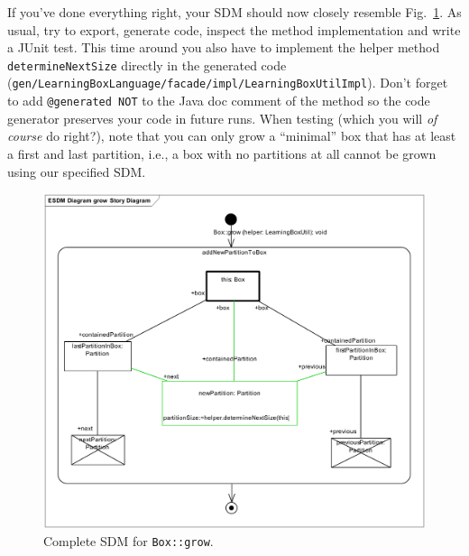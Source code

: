 If you've done everything right, your SDM should now closely resemble
Fig.~\ref{fig:sdm_grow_5}.  As usual, try to export, generate code, inspect the
method implementation and write a JUnit test.  This time around you also have to
implement the helper method \texttt{determineNextSize} directly in the
generated code
(\texttt{gen/\-LearningBoxLanguage/\-facade/\-impl/\-LearningBoxUtilImpl}).
Don't forget to add \texttt{@generated NOT} to the Java doc comment of the
method so the code generator preserves your code in future runs.
When testing (which you will \emph{of course} do right?), note that you can only grow a ``minimal'' box that has at least a first and last partition, i.e., a box with no partitions at all cannot be grown using our specified SDM. 

\begin{figure}[htbp]
\begin{center}
  \includegraphics[width=\textwidth]{pics/sdmBilder/grow/sdm67}
  \caption{Complete SDM for \texttt{Box::grow}.}  
  \label{fig:sdm_grow_5}
\end{center}
\end{figure}
